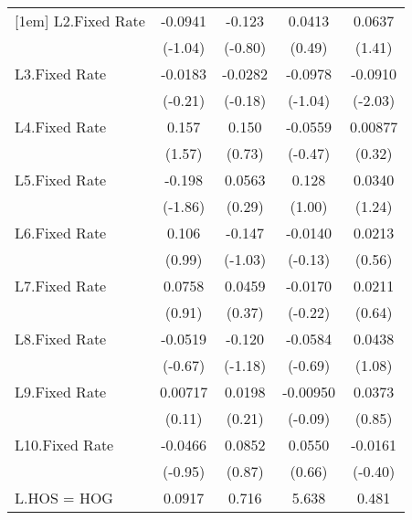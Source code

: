 {\begin{longtable}{l*{4}{c}}
[1em]
L2.Fixed Rate   &  -0.0941         &   -0.123         &   0.0413         &   0.0637         \\
                &  (-1.04)         &  (-0.80)         &   (0.49)         &   (1.41)         \\
[1em]
L3.Fixed Rate   &  -0.0183         &  -0.0282         &  -0.0978         &  -0.0910\sym{*}  \\
                &  (-0.21)         &  (-0.18)         &  (-1.04)         &  (-2.03)         \\
[1em]
L4.Fixed Rate   &    0.157         &    0.150         &  -0.0559         &  0.00877         \\
                &   (1.57)         &   (0.73)         &  (-0.47)         &   (0.32)         \\
[1em]
L5.Fixed Rate   &   -0.198         &   0.0563         &    0.128         &   0.0340         \\
                &  (-1.86)         &   (0.29)         &   (1.00)         &   (1.24)         \\
[1em]
L6.Fixed Rate   &    0.106         &   -0.147         &  -0.0140         &   0.0213         \\
                &   (0.99)         &  (-1.03)         &  (-0.13)         &   (0.56)         \\
[1em]
L7.Fixed Rate   &   0.0758         &   0.0459         &  -0.0170         &   0.0211         \\
                &   (0.91)         &   (0.37)         &  (-0.22)         &   (0.64)         \\
[1em]
L8.Fixed Rate   &  -0.0519         &   -0.120         &  -0.0584         &   0.0438         \\
                &  (-0.67)         &  (-1.18)         &  (-0.69)         &   (1.08)         \\
[1em]
L9.Fixed Rate   &  0.00717         &   0.0198         & -0.00950         &   0.0373         \\
                &   (0.11)         &   (0.21)         &  (-0.09)         &   (0.85)         \\
[1em]
L10.Fixed Rate  &  -0.0466         &   0.0852         &   0.0550         &  -0.0161         \\
                &  (-0.95)         &   (0.87)         &   (0.66)         &  (-0.40)         \\
[1em]
L.HOS = HOG     &   0.0917         &    0.716         &    5.638\sym{**} &    0.481         \\

\end{longtable}}
